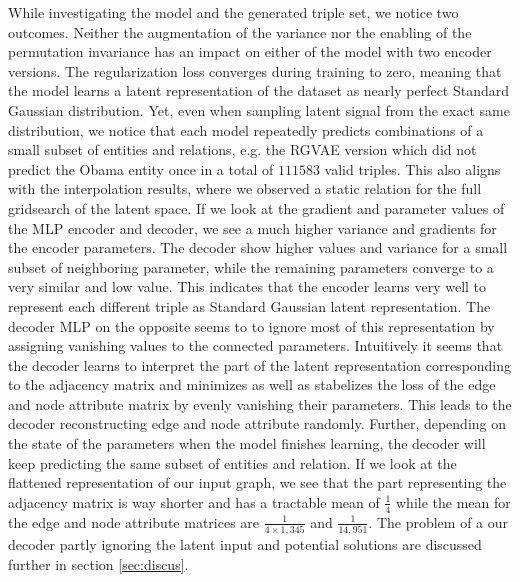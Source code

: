 While investigating the model and the generated triple set, we notice two outcomes. Neither the augmentation of the variance nor the enabling of the permutation invariance has an impact on either of the model with two encoder versions. The regularization loss converges during training to zero, meaning that the model learns a latent representation of the dataset as  nearly perfect Standard Gaussian distribution. Yet, even when sampling latent signal from the exact same distribution, we notice that each model repeatedly predicts combinations of a small subset of entities and relations, e.g. the RGVAE version which did not predict the Obama entity once in a total of $111583$ valid triples. This also aligns with the interpolation results, where we observed a static relation for the full gridsearch of the latent space. If we look at the gradient and parameter values of the MLP encoder and decoder, we see a much higher variance and gradients for the encoder parameters. The decoder show higher values and variance for a small subset of neighboring parameter, while the remaining parameters converge to a very similar and low value. This indicates that the encoder learns very well to represent each different triple as Standard Gaussian latent representation. The decoder MLP on the opposite seems to to ignore most of this representation by assigning vanishing values to the connected parameters. Intuitively it seems that the decoder learns to interpret the part of the latent representation corresponding to the adjacency matrix and minimizes as well as stabelizes the loss of the edge and node attribute matrix by evenly vanishing their parameters. This leads to the decoder reconstructing edge and node attribute randomly. Further, depending on the state of the parameters when the model finishes learning, the decoder will keep predicting the same subset of entities and relation. If we look at the flattened representation of our input graph, we see that the part representing the adjacency matrix is way shorter and has a tractable mean of $\frac{1}{4}$ while the mean for the edge and node attribute matrices are $\frac{1}{4 \times 1,345}$ and $\frac{1}{14,951}$. The problem of a our decoder partly ignoring the latent input and potential solutions are discussed further in section \ref{sec:discus}. 





